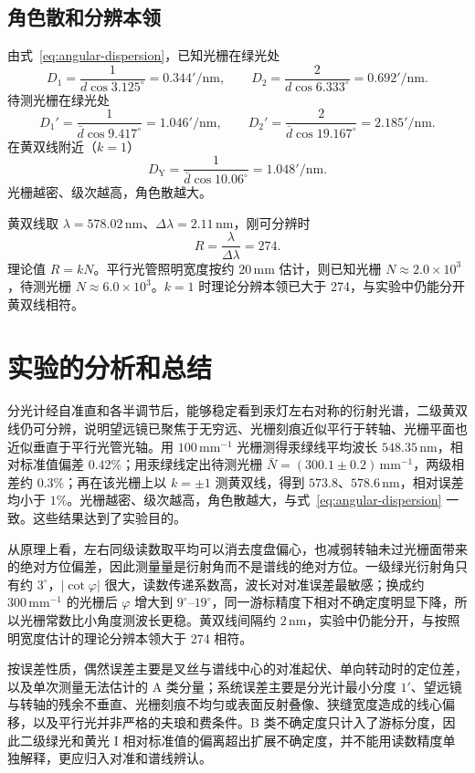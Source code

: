 \documentclass{../template/myrpt}
\begin{document}
\subsection{角色散和分辨本领}

由式~\eqref{eq:angular-dispersion}，已知光栅在绿光处
\[
  D_1=\frac{1}{d\cos 3.125^\circ}=0.344'/\si{\nano\metre},\qquad
  D_2=\frac{2}{d\cos 6.333^\circ}=0.692'/\si{\nano\metre}.
\]
待测光栅在绿光处
\[
  D_1'=\frac{1}{\bar d\cos 9.417^\circ}=1.046'/\si{\nano\metre},\qquad
  D_2'=\frac{2}{\bar d\cos 19.167^\circ}=2.185'/\si{\nano\metre}.
\]
在黄双线附近（$k=1$）
\[
  D_{\mathrm{Y}}=\frac{1}{\bar d\cos 10.06^\circ}=1.048'/\si{\nano\metre}.
\]
光栅越密、级次越高，角色散越大。

黄双线取 $\lambda=578.02\,\si{\nano\metre}$、$\Delta\lambda=2.11\,\si{\nano\metre}$，刚可分辨时
\[
  R=\frac{\lambda}{\Delta\lambda}=274.
\]
理论值 $R=kN$。平行光管照明宽度按约 $20\,\si{\milli\metre}$ 估计，则已知光栅 $N\approx2.0\times10^{3}$，待测光栅 $N\approx6.0\times10^{3}$。$k=1$ 时理论分辨本领已大于 274，与实验中仍能分开黄双线相符。

\section{实验的分析和总结}

分光计经自准直和各半调节后，能够稳定看到汞灯左右对称的衍射光谱，二级黄双线仍可分辨，说明望远镜已聚焦于无穷远、光栅刻痕近似平行于转轴、光栅平面也近似垂直于平行光管光轴。用 $100\,\mathrm{mm}^{-1}$ 光栅测得汞绿线平均波长 $548.35\,\si{\nano\metre}$，相对标准值偏差 $0.42\%$；用汞绿线定出待测光栅 $\bar N=(300.1\pm0.2)\,\mathrm{mm}^{-1}$，两级相差约 $0.3\%$；再在该光栅上以 $k=\pm1$ 测黄双线，得到 $573.8$、$578.6\,\si{\nano\metre}$，相对误差均小于 $1\%$。光栅越密、级次越高，角色散越大，与式~\eqref{eq:angular-dispersion} 一致。这些结果达到了实验目的。

从原理上看，左右同级读数取平均可以消去度盘偏心，也减弱转轴未过光栅面带来的绝对方位偏差，因此测量量是衍射角而不是谱线的绝对方位。一级绿光衍射角只有约 $3^\circ$，$\lvert\cot\varphi\rvert$ 很大，读数传递系数高，波长对对准误差最敏感；换成约 $300\,\mathrm{mm}^{-1}$ 的光栅后 $\varphi$ 增大到 $9^\circ$--$19^\circ$，同一游标精度下相对不确定度明显下降，所以光栅常数比小角度测波长更稳。黄双线间隔约 $2\,\si{\nano\metre}$，实验中仍能分开，与按照明宽度估计的理论分辨本领大于 274 相符。

按误差性质，偶然误差主要是叉丝与谱线中心的对准起伏、单向转动时的定位差，以及单次测量无法估计的 A 类分量；系统误差主要是分光计最小分度 $1'$、望远镜与转轴的残余不垂直、光栅刻痕不均匀或表面反射叠像、狭缝宽度造成的线心偏移，以及平行光并非严格的夫琅和费条件。B 类不确定度只计入了游标分度，因此二级绿光和黄光 I 相对标准值的偏离超出扩展不确定度，并不能用读数精度单独解释，更应归入对准和谱线辨认。
\end{document}

